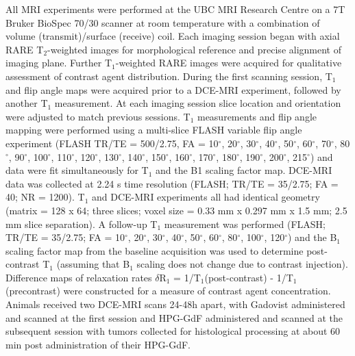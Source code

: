 All MRI experiments were performed at the UBC MRI Research Centre on a 7T Bruker BioSpec 70/30 scanner at room temperature with a combination of volume (transmit)/surface (receive) coil.
Each imaging session began with axial RARE T$_2$-weighted images for morphological reference and precise alignment of imaging plane.
Further T$_1$-weighted RARE images were acquired for qualitative assessment of contrast agent distribution.
During the first scanning session, T$_1$ and flip angle maps were acquired prior to a DCE-MRI experiment, followed by another T$_1$ measurement.
At each imaging session slice location and orientation were adjusted to match previous sessions.
T$_1$ measurements and flip angle mapping were performed using a multi-slice FLASH variable flip angle experiment (FLASH TR/TE = 500/2.75, FA = 10$^{\circ}$, 20$^{\circ}$, 30$^{\circ}$, 40$^{\circ}$, 50$^{\circ}$, 60$^{\circ}$, 70$^{\circ}$, 80$^{\circ}$, 90$^{\circ}$, 100$^{\circ}$, 110$^{\circ}$, 120$^{\circ}$, 130$^{\circ}$, 140$^{\circ}$, 150$^{\circ}$, 160$^{\circ}$, 170$^{\circ}$, 180$^{\circ}$, 190$^{\circ}$, 200$^{\circ}$, 215$^{\circ}$) and data were fit simultaneously for T$_1$ and the B1 scaling factor map.
DCE-MRI data was collected at 2.24 s time resolution (FLASH; TR/TE = 35/2.75; FA = 40; NR = 1200).
T$_1$ and DCE-MRI experiments all had identical geometry (matrix = 128 x 64; three slices; voxel size = 0.33 mm x 0.297 mm x 1.5 mm; 2.5 mm slice separation).
A follow-up T$_1$ measurement was performed (FLASH; TR/TE = 35/2.75; FA = 10$^{\circ}$, 20$^{\circ}$, 30$^{\circ}$, 40$^{\circ}$, 50$^{\circ}$, 60$^{\circ}$, 80$^{\circ}$, 100$^{\circ}$, 120$^{\circ}$) and the B$_1$ scaling factor map from the baseline acquisition was used to determine post-contrast T$_1$ (assuming that B$_1$ scaling does not change due to contrast injection).
Difference maps of relaxation rates $\delta$R$_1$ = 1/T$_1$(post-contrast) - 1/T$_1$(precontrast) were constructed for a measure of contrast agent concentration.
Animals received two DCE-MRI scans 24-48h apart, with Gadovist administered and scanned at the first session and HPG-GdF administered and scanned at the subsequent session with tumors collected for histological processing at about 60 min post administration of their HPG-GdF.


